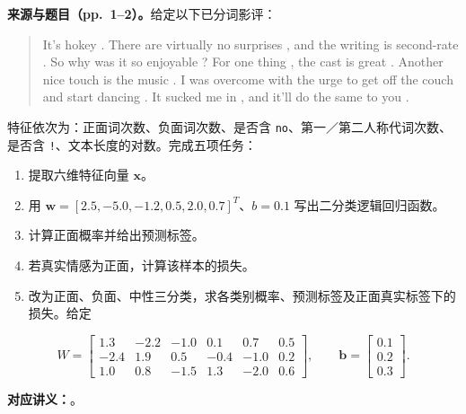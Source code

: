 \textbf{来源与题目（pp.~1--2）。}给定以下已分词影评：
\begin{quote}
\small
It's hokey . There are virtually no surprises , and the writing is second-rate .
So why was it so enjoyable ? For one thing , the cast is great . Another nice touch
is the music . I was overcome with the urge to get off the couch and start dancing .
It sucked me in , and it'll do the same to you .
\end{quote}
特征依次为：正面词次数、负面词次数、是否含 \texttt{no}、第一／第二人称代词次数、是否含 \texttt{!}、文本长度的对数。完成五项任务：
\begin{enumerate}[label=(\arabic*)]
 \item 提取六维特征向量 $\mathbf x$。
 \item 用 $\mathbf w=[2.5,-5.0,-1.2,0.5,2.0,0.7]^T$、$b=0.1$ 写出二分类逻辑回归函数。
 \item 计算正面概率并给出预测标签。
 \item 若真实情感为正面，计算该样本的损失。
 \item 改为正面、负面、中性三分类，求各类别概率、预测标签及正面真实标签下的损失。给定
\end{enumerate}
\[
 W=\begin{bmatrix}
 1.3&-2.2&-1.0&0.1&0.7&0.5\\
 -2.4&1.9&0.5&-0.4&-1.0&0.2\\
 1.0&0.8&-1.5&1.3&-2.0&0.6
 \end{bmatrix},\qquad
 \mathbf b=\begin{bmatrix}0.1\\0.2\\0.3\end{bmatrix}.
\]

\textbf{对应讲义：}。

